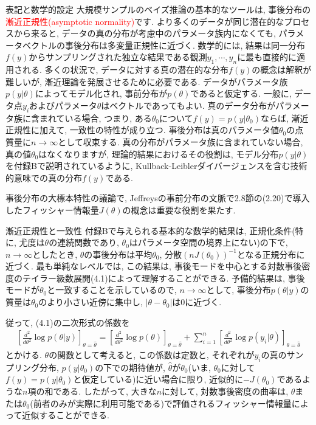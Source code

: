 \documentclass[10pt,dvipdfmx,a4]{beamer}
\newcommand{\eqn}[1]{\begin{align*}#1\end{align*}}
\newcommand{\tcr}[1]{\textcolor{red}{#1}}
\begin{document}
\begin{frame}{表記と数学的設定}
大規模サンプルのベイズ推論の基本的なツールは, 事後分布の\tcr{漸近正規性(asymptotic normality)}です.
より多くのデータが同じ潜在的なプロセスから来ると, データの真の分布が考慮中のパラメータ族内になくても, パラメータベクトルの事後分布は多変量正規性に近づく.
数学的には, 結果は同一分布$f(y)$からサンプリングされた独立な結果である観測$y_1,\cdots,y_n$に最も直接的に適用される.
多くの状況で, データに対する真の潜在的な分布$f(y)$の概念は解釈が難しいが, 漸近理論を発展させるために必要である.
データがパラメータ族$p(y|\theta)$によってモデル化され, 事前分布が$p(\theta)$であると仮定する.
一般に, データ点$y_i$およびパラメータ$\theta$はベクトルであってもよい.
真のデータ分布がパラメータ族に含まれている場合, つまり, ある$\theta_0$について$f(y)=p(y|\theta_0)$ならば, 漸近正規性に加えて, 一致性の特性が成り立つ.
事後分布は真のパラメータ値$\theta_0$の点質量に$n\rightarrow \infty$として収束する.
真の分布がパラメータ族に含まれていない場合, 真の値$\theta_0$はなくなりますが, 理論的結果におけるその役割は, モデル分布$p(y|\theta)$を付録Bで説明されているように, Kullback-Leiblerダイバージェンスを含む技術的意味での真の分布$f(y)$である.

事後分布の大標本特性の議論で, Jeffreysの事前分布の文脈で2.8節の(2.20)で導入したフィッシャー情報量$J(\theta)$の概念は重要な役割を果たす.
\end{frame}


\begin{frame}{漸近正規性と一致性}
付録Bで与えられる基本的な数学的結果は, 正規化条件(特に, 尤度は$\theta$の連続関数であり, $\theta_0$はパラメータ空間の境界上にない)の下で, $n\rightarrow\infty$としたとき, $\theta$の事後分布は平均$\theta_0$, 分散$(nJ(\theta_0))^{-1}$となる正規分布に近づく.
最も単純なレベルでは, この結果は, 事後モードを中心とする対数事後密度のテイラー級数展開(4.1)によって理解することができる.
予備的結果は, 事後モードが$\theta_0$と一致することを示しているので, $n\rightarrow \infty$として, 事後分布$p(\theta|y)$の質量は$\theta_0$のより小さい近傍に集中し, $|\theta-\theta_0|$は0に近づく.

従って, (4.1)の二次形式の係数を
\eqn{\left[\frac{d^2}{d\theta^2}\log p(\theta|y)\right]_{\theta=\hat{\theta}}=
\left[\frac{d^2}{d\theta^2}\log p(\theta)\right]_{\theta=\hat{\theta}}+
\sum_{i=1}^n\left[\frac{d^2}{d\theta^2}\log p(y_i|\theta)\right]_{\theta=\hat{\theta}}}
とかける.
$\theta$の関数として考えると, この係数は定数と, それぞれが$y_i$の真のサンプリング分布, $p(y|\theta_0)$の下での期待値が, $\hat{\theta}$が$\theta_0$(いま, $\theta_0$に対して$f(y)=p(y|\theta_0)$と仮定している)に近い場合に限り, 近似的に$-J(\theta_0)$であるような$n$項の和である.
したがって, 大きな$n$に対して, 対数事後密度の曲率は, $\theta$または$\theta_0$(前者のみが実際に利用可能である)で評価されるフィッシャー情報量によって近似することができる.
\end{frame}
\end{document}
